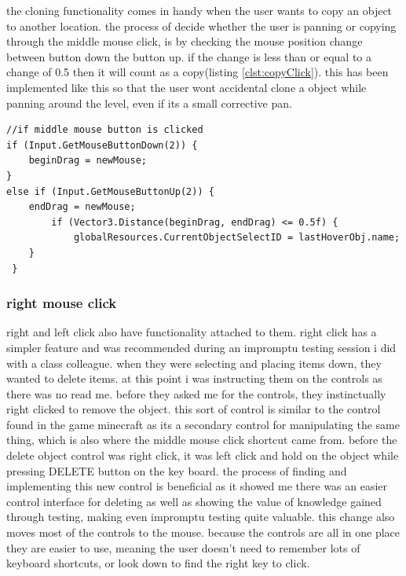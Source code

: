 the cloning functionality comes in handy when the user wants to copy an object to another location. the process of decide whether the user is panning or copying through the middle mouse click, is by checking the mouse position change between button down the button up. if the change is less than or equal to a change of 0.5 then it will count as a copy(listing \ref{clst:copyClick}). this has been implemented like this so that the user wont accidental clone a object while panning around the level, even if its a small corrective pan.
\begin{minipage}{\textwidth}
\begin{lstlisting}[language={[Sharp]C}, caption=Copy Object, label=clst:copyClick]
//if middle mouse button is clicked
if (Input.GetMouseButtonDown(2)) {
	beginDrag = newMouse;
}
else if (Input.GetMouseButtonUp(2)) {
	endDrag = newMouse;
		if (Vector3.Distance(beginDrag, endDrag) <= 0.5f) {
			globalResources.CurrentObjectSelectID = lastHoverObj.name;
	}
 }
\end{lstlisting}
\end{minipage}

\subsubsection{right mouse click}
right and left click also have functionality attached to them. right click has a simpler feature and was recommended during an impromptu testing session i did with a class colleague. when they were selecting and placing items down, they wanted to delete items. at this point i was instructing them on the controls as there was no read me. before they asked me for the controls, they instinctually right clicked to remove the object. this sort of control is similar to the control found in the game minecraft as its a secondary control for manipulating the same thing, which is also where the middle mouse click shortcut came from. before the delete object control was right click, it was left click and hold on the object while pressing DELETE button on the key board. the process of finding and implementing this new control is beneficial as it showed me there was an easier control interface for deleting as well as showing the value of knowledge gained through testing, making even impromptu testing quite valuable. this change also moves most of the controls to the mouse. because the controls are all in one place they are easier to use, meaning the user doesn't need to remember lots of keyboard shortcuts, or look down to find the right key to click.

